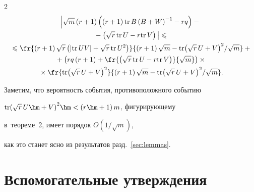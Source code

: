 \begin{multicols}{2}
\begin{multline}
    \label{Theor2}


     \left|\sqrt{m}\left(r+1\right)\left(\left(r+1\right)\mathrm{tr}\,{B\left(B+W\right)^{-1}}-


     rq\right)-{}\right.\\


\left.     {}-\left(\sqrt{r}\,\mathrm{tr}\,{U}-r\mathrm{tr}\,{V}\right)


\vphantom{\sqrt{}W^{-1}}


\right|\leqslant{}\\


{}\leqslant


\fr{ \left(r+1\right)\sqrt{r}\left(\left| \mathrm{tr}\,{UV}\right|+


\sqrt{r}\,\mathrm{tr}\,U^{2}\right)}


{ \left(r+1\right)\sqrt{m}-


{\mathrm{tr}{\left(\sqrt{r}\,U+V\right)^{2}}}/{\sqrt{m}}}+{}\\


{}+


     \left(   rq\left(r+1\right)+\fr{\left(\sqrt{r}\,\mathrm{tr}\,{U}-r\mathrm{tr}\,{V}\right)}


     {\sqrt{m}}\right)\times{}\\


     {}\times 


     \fr{\mathrm{tr}{\left(\sqrt{r}\,U+V\right)^{2}}}


     { \left(r+1\right)\sqrt{m}-


{\mathrm{tr}{\left(\sqrt{r}\,U+V\right)^{2}}}/{\sqrt{m}}}.


    \end{multline}











Заметим, что   вероятность события, противоположного событию 


$\mathrm{tr}{\left(\sqrt{r}\,U\hm+V\right)^{2}}\hm<\left(r\hm+1\right)m$, фигурирующему 


в~теореме~2, имеет порядок $O\left( {1}/{\sqrt{m}}\right)$, 


как это станет ясно из результатов разд.~\ref{sec:lemmas}.





\section{Вспомогательные утверждения}



\end{multicols}
